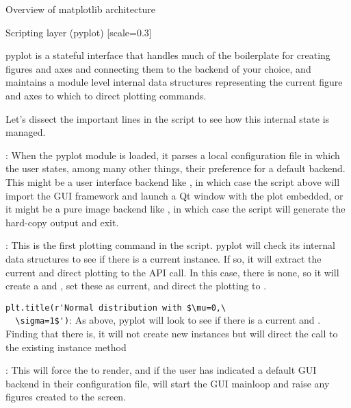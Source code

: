 \begin{aosasect1}{Overview of matplotlib architecture}
\begin{aosasect2}{Scripting layer (pyplot)}
[scale=0.3]


pyplot is a stateful interface that handles much of the boilerplate
for creating figures and axes and connecting them to the backend of
your choice, and maintains a module level internal data structures
representing the current figure and axes to which to direct plotting
commands.

Let's dissect the important lines in the script to see how this
internal state is managed.

\begin{aosaitemize}

\item {}: When the pyplot module
  is loaded, it parses a local configuration file in which the user
  states, among many other things, their preference for a default
  backend.  This might be a user interface backend like ,
  in which case the script above will import the GUI framework and
  launch a Qt window with the plot embedded, or it might be a pure
  image backend like , in which case the script will
  generate the hard-copy output and exit.

\item {}: This is the first plotting command in
  the script.  pyplot will check its internal data structures to see
  if there is a current  instance.  If so, it will
  extract the current  and direct plotting to the
   API call.  In this case, there is none, so it will
  create a  and , set these as current, and
  direct the plotting to .

\item \verb+plt.title(r'Normal distribution with $\mu=0,\
  \sigma=1$')+: As above, pyplot will look to see if there is a
  current  and .  Finding that there is, it
  will not create new instances but will direct the call to the
  existing \code{Axes} instance method 

\item {}: This will force the  to render,
  and if the user has indicated a default GUI backend in their
  configuration file, will start the GUI mainloop and raise any
  figures created to the screen.

\end{aosaitemize}


\end{aosasect2}
\end{aosasect1}
